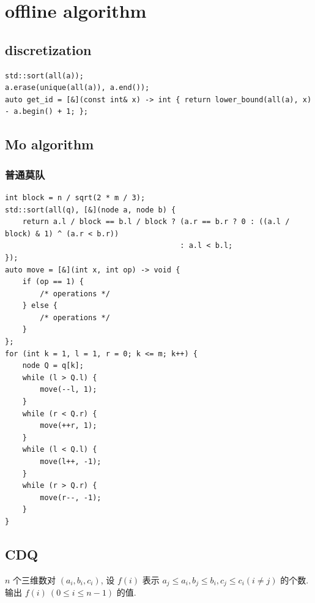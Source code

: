 \documentclass[UTF8, a4paper, titlepage, twoside]{ctexart}
\begin{document}
\newpage
\section{ offline algorithm}
\subsection{ discretization }
\begin{lstlisting}[style=cpp]
std::sort(all(a));
a.erase(unique(all(a)), a.end());
auto get_id = [&](const int& x) -> int { return lower_bound(all(a), x) - a.begin() + 1; };
\end{lstlisting}

\subsection{ Mo algorithm }
\subsubsection*{ 普通莫队 }
\begin{lstlisting}[style=cpp]
int block = n / sqrt(2 * m / 3);
std::sort(all(q), [&](node a, node b) {
    return a.l / block == b.l / block ? (a.r == b.r ? 0 : ((a.l / block) & 1) ^ (a.r < b.r))
                                        : a.l < b.l;
});
auto move = [&](int x, int op) -> void {
    if (op == 1) {
        /* operations */
    } else {
        /* operations */
    }
};
for (int k = 1, l = 1, r = 0; k <= m; k++) {
    node Q = q[k];
    while (l > Q.l) {
        move(--l, 1);
    }
    while (r < Q.r) {
        move(++r, 1);
    }
    while (l < Q.l) {
        move(l++, -1);
    }
    while (r > Q.r) {
        move(r--, -1);
    }
}
\end{lstlisting}

\subsection{ CDQ }

\(n\) 个三维数对 \((a_i, b_i, c_i)\), 设 \(f(i)\) 表示 \(a_j \leqslant a_i, b_j \leqslant b_i, c_j \leqslant c_i (i \neq j)\) 的个数.
输出 \(f(i) \ (0 \leqslant i \leqslant n - 1)\) 的值.
\end{document}
